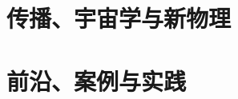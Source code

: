 \documentclass[11pt,openany,fontset=fandol]{ctexbook}
\begin{document}
\part{传播、宇宙学与新物理}




\part{前沿、案例与实践}






\appendix








\backmatter


\end{document}
